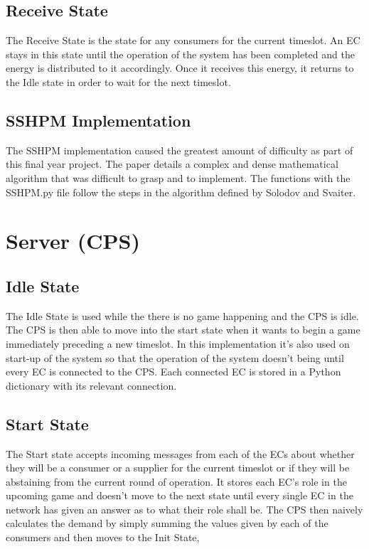 \documentclass[a4paper, notitlepage]{report}
\begin{document}
\subsection{Receive State}
\label{sec:orgc85fbeb}
The Receive State is the state for any consumers for the current timeslot. An EC
stays in this state until the operation of the system has been completed and the
energy is distributed to it accordingly. Once it receives this energy, it
returns to the Idle state in order to wait for the next timeslot.
\subsection{SSHPM Implementation}
\label{sec:orgd71bc81}
The SSHPM implementation caused the greatest amount of difficulty as part of
this final year project. The paper \cite{solodov1999new} details a complex and
dense mathematical algorithm that was difficult to grasp and to implement. The
functions with the SSHPM.py file follow the steps in the algorithm defined by
Solodov and Svaiter.
\section{Server (CPS)}
\label{sec:org322444d}
\subsection{Idle State}
\label{sec:orgfdb4b75}
The Idle State is used while the there is no game happening and the CPS is idle.
The CPS is then able to move into the start state when it wants to begin a game
immediately preceding a new timeslot. In this implementation it's also used on
start-up of the system so that the operation of the system doesn't being until
every EC is connected to the CPS. Each connected EC is stored in a Python
dictionary with its relevant connection.
\subsection{Start State}
\label{sec:org37be043}
The Start state accepts incoming messages from each of the ECs about whether
they will be a consumer or a supplier for the current timeslot or if they will
be abstaining from the current round of operation. It stores each EC's role in
the upcoming game and doesn't move to the next state until every single EC in
the network has given an answer as to what their role shall be. The CPS then
naively calculates the demand by simply summing the values given by each of the
consumers and then moves to the Init State, 
\end{document}
